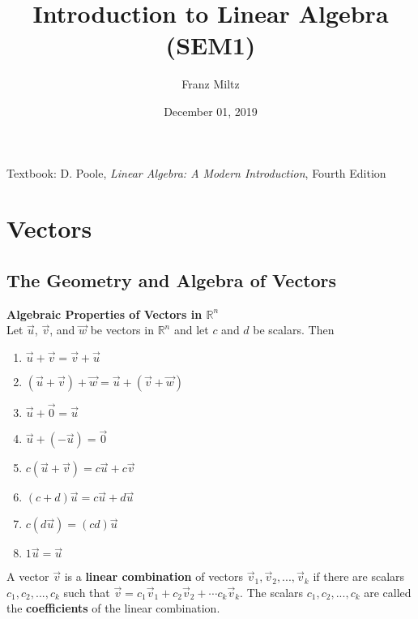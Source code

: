 \documentclass{article}
\begin{document}
\title{Introduction to Linear Algebra (SEM1)}
\author{Franz Miltz}
\date{December 01, 2019}
\maketitle
\noindent Textbook: D. Poole, \emph{Linear Algebra: A Modern Introduction}, Fourth Edition
\tableofcontents
\pagebreak
\section{Vectors}
\subsection{The Geometry and Algebra of Vectors}
\begin{theorem}
    \textbf{Algebraic Properties of Vectors in $\mathbb{R}^n$}\\
    Let $\vec u$, $\vec v$, and $\vec w$ be vectors in $\mathbb{R}^n$ and let $c$ and $d$ be scalars. Then
    \begin{enumerate}
        \item $\vec u + \vec v = \vec v + \vec u$
        \item $(\vec u + \vec v) + \vec w = \vec u + (\vec v + \vec w)$
        \item $\vec u + \vec 0 = \vec u$
        \item $\vec u + (- \vec u) = \vec 0$
        \item $c(\vec u + \vec v) = c\vec u + c\vec v$
        \item $(c+d)\vec u = c\vec u + d\vec u$
        \item $c(d\vec u) = (cd)\vec u$
        \item $1\vec u = \vec u$
    \end{enumerate}
\end{theorem}
\begin{definition}
    A vector $\vec v$ is a \textbf{linear combination} of vectors $\vec v_1, \vec v_2, ...,\vec v_k$ if there are scalars $c_1, c_2, ..., c_k$ such that $\vec v = c_1 \vec v_1 + c_2 \vec v_2 + \cdots c_k\vec v_k$. The scalars $c_1, c_2, ..., c_k$ are called the \textbf{coefficients} of the linear combination.
\end{definition}
\end{document}
